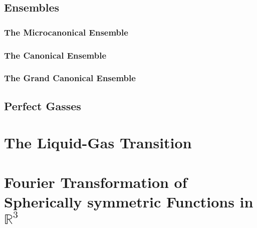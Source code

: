 \documentclass[a4paper,11pt]{article}
\begin{document}
\subsection{Ensembles}\label{sec:enembles}
\subsubsection{The Microcanonical Ensemble}
\subsubsection{The Canonical Ensemble}
\subsubsection{The Grand Canonical Ensemble}
\subsection{Perfect Gasses}\label{sec:perfect}


\section{The Liquid-Gas Transition}
\section{Fourier Transformation of Spherically symmetric Functions in $\mathbb{R}^3$}\label{sec:ft_3d}


\cite{hansen1990theory,mcquarrie2000statistical,
    press1992numerical, reif2009fundamentals,hill1986introduction,ben2006molecular}
\newpage


\end{document}
